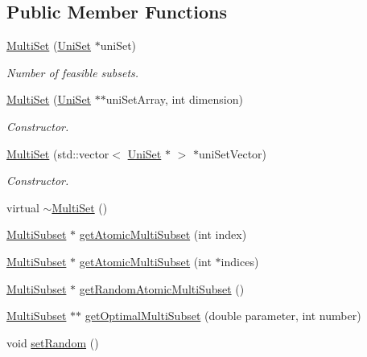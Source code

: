 \subsection*{Public Member Functions}
\begin{DoxyCompactItemize}
\item 
\hyperlink{classMultiSet_aa6ec2e2e6ef524acde12c795629f08c8}{Multi\-Set} (\hyperlink{classUniSet}{Uni\-Set} $\ast$uni\-Set)
\begin{DoxyCompactList}\small\item\em Number of feasible subsets. \end{DoxyCompactList}\item 
\hyperlink{classMultiSet_abafc2f4fb50484d3aabdd744dc1d6cc5}{Multi\-Set} (\hyperlink{classUniSet}{Uni\-Set} $\ast$$\ast$uni\-Set\-Array, int dimension)
\begin{DoxyCompactList}\small\item\em Constructor. \end{DoxyCompactList}\item 
\hyperlink{classMultiSet_ace92943f7461b6f683c7c4da76408e73}{Multi\-Set} (std\-::vector$<$ \hyperlink{classUniSet}{Uni\-Set} $\ast$ $>$ $\ast$uni\-Set\-Vector)
\begin{DoxyCompactList}\small\item\em Constructor. \end{DoxyCompactList}\item 
virtual \hyperlink{classMultiSet_a3ad638b1613083b97a53ea58e9060a4d}{$\sim$\-Multi\-Set} ()
\item 
\hyperlink{classMultiSubset}{Multi\-Subset} $\ast$ \hyperlink{classMultiSet_a48a6504163110d377db974d6ea5bd8fe}{get\-Atomic\-Multi\-Subset} (int index)
\item 
\hyperlink{classMultiSubset}{Multi\-Subset} $\ast$ \hyperlink{classMultiSet_a91d471ce84161187ab63f56199c74ab3}{get\-Atomic\-Multi\-Subset} (int $\ast$indices)
\item 
\hyperlink{classMultiSubset}{Multi\-Subset} $\ast$ \hyperlink{classMultiSet_afe3111c90692136b5141a4c5b96e2da3}{get\-Random\-Atomic\-Multi\-Subset} ()
\item 
\hyperlink{classMultiSubset}{Multi\-Subset} $\ast$$\ast$ \hyperlink{classMultiSet_aabac7439b455032f959bb6ce9d145f7e}{get\-Optimal\-Multi\-Subset} (double parameter, int number)
\item 
\hypertarget{classMultiSet_aac2d5ee0afa30a8f565f29204a677cd9}{void \hyperlink{classMultiSet_aac2d5ee0afa30a8f565f29204a677cd9}{set\-Random} ()}\label{classMultiSet_aac2d5ee0afa30a8f565f29204a677cd9}


\end{DoxyCompactItemize}
